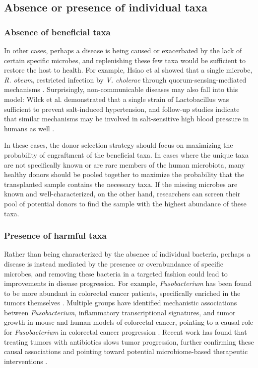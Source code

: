 \subsection{Absence or presence of individual taxa}

\subsubsection{Absence of beneficial taxa}

In other cases, perhaps a disease is being caused or exacerbated by the lack of certain specific microbes, and replenishing these few taxa would be sufficient to restore the host to health.
For example, Hsiao et al showed that a single microbe, \textit{R. obeum}, restricted infection by \textit{V. cholerae} through quorum-sensing-mediated mechanisms \cite{Hsiao2014}.
Surprisingly, non-communicable diseases may also fall into this model: Wilck et al. demonstrated that a single strain of Lactobacillus was sufficient to prevent salt-induced hypertension, and follow-up studies indicate that similar mechanisms may be involved in salt-sensitive high blood pressure in humans as well \cite{Wilck2017}.

In these cases, the donor selection strategy should focus on maximizing the probability of engraftment of the beneficial taxa.
In cases where the unique taxa are not specifically known or are rare members of the human microbiota, many healthy donors should be pooled together to maximize the probability that the transplanted sample contains the necessary taxa.
If the missing microbes are known and well-characterized, on the other hand, researchers can screen their pool of potential donors to find the sample with the highest abundance of these taxa.

\subsubsection{Presence of harmful taxa}

Rather than being characterized by the absence of individual bacteria, perhaps a disease is instead mediated by the presence or overabundance of specific microbes, and removing these bacteria in a targeted fashion could lead to improvements in disease progression.
For example, \textit{Fusobacterium} has been found to be more abundant in colorectal cancer patients, specifically enriched in the tumors themselves \cite{Kostic2013}.
Multiple groups have identified mechanistic associations between \textit{Fusobacterium}, inflammatory transcriptional signatures, and tumor growth in mouse and human models of colorectal cancer, pointing to a causal role for \textit{Fusobacterium} in colorectal cancer progression \cite{Kostic2013,Rubinstein2013}.
Recent work has found that treating tumors with antibiotics slows tumor progression, further confirming these causal associations and pointing toward potential microbiome-based therapeutic interventions \cite{Bullman2017}.

